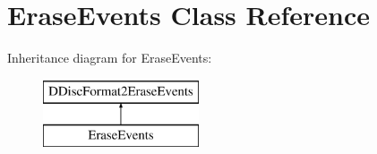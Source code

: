 \hypertarget{class_erase_events}{}\section{Erase\+Events Class Reference}
\label{class_erase_events}
Inheritance diagram for Erase\+Events\+:\begin{figure}[H]
\begin{center}
\leavevmode
\includegraphics[height=2.000000cm]{class_erase_events}
\end{center}
\end{figure}
